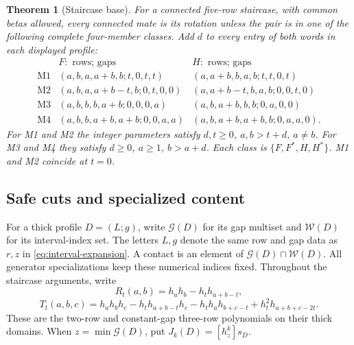 \documentclass[11pt,a4paper]{amsart}
\numberwithin{equation}{section}
\theoremstyle{plain}
\newtheorem{theorem}{Theorem}[section]
\theoremstyle{definition}
\begin{document}
\begin{theorem}[Staircase base]\label{thm:staircase-base}
For a connected five-row staircase, with common betas allowed, every
connected mate is its rotation unless the pair is in one of the following
complete four-member classes.  Add \(d\) to every entry of both words in
each displayed profile:
\begin{equation}\label{eq:staircase-families}
\begin{array}{c|c|c}
 &F:\text{ rows; gaps}&H:\text{ rows; gaps}\\\hline
\mathrm{M1}&(a,b,a,a+b,b;t,0,t,t)&(a,a+b,b,a,b;t,t,0,t)\\
\mathrm{M2}&(a,b,a,a+b-t,b;0,t,0,0)&(a,a+b-t,b,a,b;0,0,t,0)\\
\mathrm{M3}&(a,b,b,b,a+b;0,0,0,a)&(a,b,a+b,b,b;0,a,0,0)\\
\mathrm{M4}&(a,b,b,a+b,a+b;0,0,a,a)&(a,b,a+b,a+b,b;0,a,a,0).
\end{array}
\end{equation}
For M1 and M2 the integer parameters satisfy
\(d,t\ge0\), \(a,b>t+d\), \(a\ne b\).
For M3 and M4 they satisfy \(d\ge0\), \(a\ge1\), \(b>a+d\).
Each class is \(\{F,F^*,H,H^*\}\).  M1 and M2 coincide at \(t=0\).

\end{theorem}

\subsection{Safe cuts and specialized content}

For a thick profile \(D=(L;g)\), write \(\mathcal G(D)\) for its gap
multiset and \(\mathcal W(D)\) for its interval-index set.  The letters
\(L,g\) denote the same row and gap data as \(r,z\) in
\eqref{eq:interval-expansion}.  A contact is an element of
\(\mathcal G(D)\cap\mathcal W(D)\).  All generator specializations
keep these numerical indices fixed.  Throughout the staircase arguments, write
\[
 R_t(a,b)=h_ah_b-h_th_{a+b-t},
\]
\[
 T_t(a,b,c)=h_ah_bh_c-h_th_{a+b-t}h_c
           -h_th_ah_{b+c-t}+h_t^2h_{a+b+c-2t}.
\]
These are the two-row and constant-gap three-row polynomials on their
thick domains.  When \(z=\min\mathcal G(D)\), put
\(J_k(D)=[h_z^k]s_D\).
\end{document}
